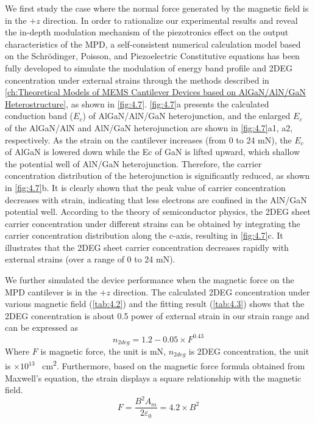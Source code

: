 We first study the case where the normal force generated by the magnetic field is in the $+z$ direction. In order to rationalize our experimental results and reveal the in-depth modulation mechanism of the piezotronics effect on the output characteristics of the MPD, a self-consistent numerical calculation model based on the Schrödinger, Poisson, and Piezoelectric Constitutive equations has been fully developed to simulate the modulation of energy band profile and 2DEG concentration  under external strains \cite{jogai2002free,tan1990self,jiang2017piezotronic} through the methods described in \autoref{ch:Theoretical Models of MEMS Cantilever Devices based on AlGaN/AlN/GaN Heterostructure}, as shown in \autoref{fig:4.7}. \autoref{fig:4.7}a presents the calculated conduction band  ($E_{c}$) of  AlGaN/AlN/GaN heterojunction, and the enlarged $E_{c}$ of the AlGaN/AlN and AlN/GaN heterojunction are shown in \autoref{fig:4.7}a1, a2, respectively. As the strain on the cantilever  increases (from 0 to 24 \unit{\mN}), the $E_{c}$ of AlGaN is lowered down while the Ec of GaN is lifted upward, which shallow the  potential well of AlN/GaN heterojunction. Therefore, the carrier  concentration  distribution of the heterojunction is significantly reduced, as shown in \autoref{fig:4.7}b. It is clearly shown that the peak value of carrier concentration decreases with strain, indicating that less electrons are confined in the AlN/GaN potential well. According to the theory of semiconductor physics, the 2DEG sheet carrier concentration under different strains can be obtained by integrating the carrier concentration distribution along the c-axis, resulting in \autoref{fig:4.7}c. It illustrates that the 2DEG sheet carrier concentration decreases rapidly with external strains (over a range of 0 to 24 \unit{\mN}). 

We  further simulated the device performance when the magnetic force on the MPD cantilever  is in the $+z$ direction. The calculated 2DEG concentration under various magnetic field (\autoref{tab:4.2}) and the fitting result (\autoref{tab:4.3}) shows that the 2DEG concentration is about 0.5 power of external strain in our strain range and can be expressed as
\begin{equation}
	n_{2deg}=1.2 - 0.05\times F^{0.43} 
\label{eq:4.2}
\end{equation}
Where $F$ is magnetic force, the unit is \unit{\mN}, $n_{2deg}$ is 2DEG concentration, the unit is $\times 10^{13}$ \unit{\per\square\cm}. Furthermore, based on the magnetic force formula obtained from Maxwell’s equation, the strain displays a square relationship with the magnetic field. 
\begin{equation}
F=\frac{B^{2} A_{m}}{2 \varepsilon_{0}}=4.2 \times B^{2}
\label{eq:4.3}
\end{equation}



